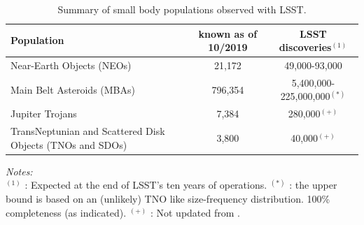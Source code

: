 \begin{table}[tb!]
\begin{center}
\caption{Summary of small body populations observed with \gls{LSST}.}
\label{tab:table1}
 {\scriptsize
  \begin{tabular}{|l|c|c|}\hline\hline
Population & known as of 10/2019 &  \gls{LSST} discoveries$^{(1)}$ \\ \hline
Near-Earth Objects (NEOs) & 21,172 & 49,000-93,000  \\\hline
Main Belt Asteroids (MBAs) & 796,354 & 5,400,000-225,000,000$^{(*)}$  \\ \hline
Jupiter Trojans & 7,384 & 280,000$^{(+)}$\\ \hline
TransNeptunian and Scattered Disk Objects (TNOs and SDOs) & 3,800 & 40,000$^{(+)}$ \\ \hline\hline
 \end{tabular}
  }
 \end{center}
\vspace{1mm}
 \scriptsize{
 {\it Notes:}\\
  $^{(1)}$ : Expected at the end of \gls{LSST}'s ten years of operations.
  $^{(*)}$ : the upper bound is based on an (unlikely) \gls{TNO} like size-frequency distribution.
  100\% completeness (as indicated).
  $^{(+)}$ : Not updated from \citep{jones2015asteroid}.}
\end{table}


